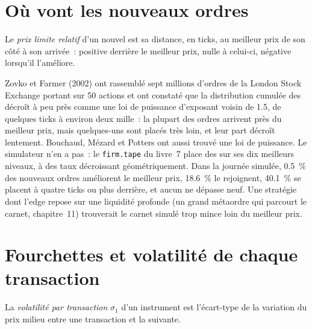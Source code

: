 \section{Où vont les nouveaux ordres}

\begin{definition}\label{def:mx:empirical-facts-of-order-books:relative}
Le \emph{prix limite relatif} d'un nouvel  est sa distance, en ticks, au meilleur prix de son côté à son
arrivée~: positive derrière le meilleur prix, nulle à celui-ci, négative lorsqu'il l'améliore.
\end{definition}

Zovko et Farmer (2002) ont rassemblé sept millions d'ordres de la London Stock Exchange portant sur 50 actions et ont constaté que la distribution cumulée des  décroît à peu près comme une loi de puissance d'exposant voisin de 1.5, de quelques ticks à environ deux mille~: la plupart des ordres arrivent près du meilleur prix, mais quelques-uns
sont placés très loin, et leur part décroît lentement. Bouchaud, Mézard et Potters ont aussi trouvé une loi de puissance. Le simulateur n'en a pas~: le
\texttt{firm.tape} du livre~7 place des  sur ses dix meilleurs niveaux, à des taux décroissant géométriquement. Dans la journée simulée, 0.5~\% des nouveaux ordres améliorent le
meilleur prix, 18.6~\% le rejoignent, 40.1~\% se placent à quatre ticks ou plus derrière, et aucun ne dépasse neuf. Une stratégie dont l'edge repose sur une liquidité profonde (un
grand métaordre qui parcourt le carnet, chapitre~11) trouverait le carnet simulé trop mince loin du meilleur prix.

\section{Fourchettes et volatilité de chaque transaction}

\begin{definition}\label{def:mx:empirical-facts-of-order-books:vol}
La \emph{volatilité par transaction} $\sigma_1$ d'un instrument est l'écart-type de la variation du prix milieu entre
une transaction et la suivante.
\end{definition}


